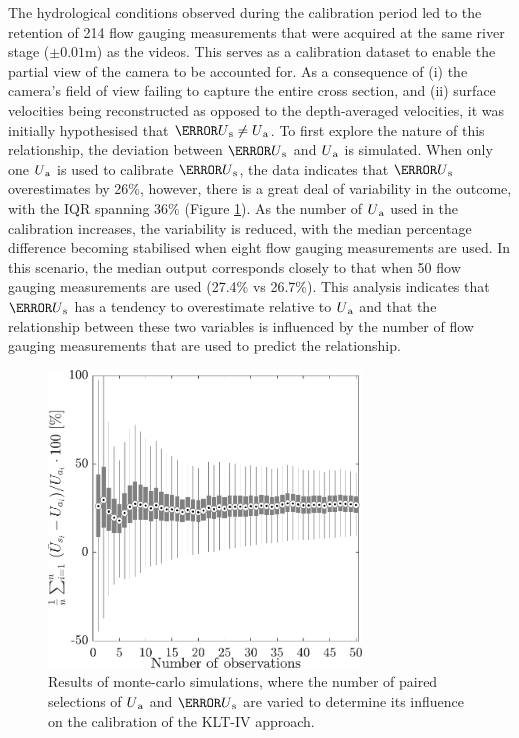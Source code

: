\documentclass[hess, manuscript]{copernicus} %
\begin{document}
The hydrological conditions observed during the calibration period led to the retention of 214 flow gauging measurements that were acquired at the same river stage ($\pm{0.01}$m) as the videos. This serves as a calibration dataset to enable the partial view of the camera to be accounted for. As a consequence of (i) the camera's field of view failing to capture the entire cross section, and (ii) surface velocities being reconstructed as opposed to the depth-averaged velocities, it was initially hypothesised that ${\bar{U}\textsubscript{s}} \neq U\textsubscript{a}$. To first explore the nature of this relationship, the deviation between $\bar{U}\textsubscript{s}$ and $U\textsubscript{a}$ is simulated. When only one $U\textsubscript{a}$ is used to calibrate $\bar{U}\textsubscript{s}$, the data indicates that $\bar{U}\textsubscript{s}$ overestimates by 26\%, however, there is a great deal of variability in the outcome, with the IQR spanning 36\% (Figure \ref{Figure6}). As the number of $U\textsubscript{a}$ used in the calibration increases, the variability is reduced, with the median percentage difference becoming stabilised when eight flow gauging measurements are used. In this scenario, the median output corresponds closely to that when 50 flow gauging measurements are used (27.4\% vs 26.7\%). This analysis indicates that $\bar{U}\textsubscript{s}$ has a tendency to overestimate relative to $U\textsubscript{a}$ and that the relationship between these two variables is influenced by the number of flow gauging measurements that are used to predict the relationship.

\begin{figure}[!htb]
\centering 
\includegraphics[width=8.3cm]{Main/Initial_submission_2024/Figures/Figure6.pdf}
\caption{Results of monte-carlo simulations, where the number of paired selections of $U\textsubscript{a}$ and $\bar{U}\textsubscript{s}$ are varied to determine its influence on the calibration of the KLT-IV approach.}
\label{Figure6} 
\end{figure}
\end{document}
